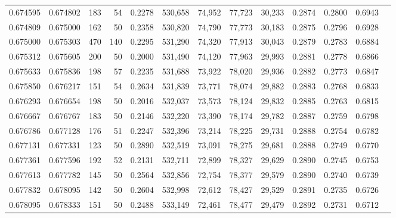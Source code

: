 \begin{tabular}{rrrrrrrrrrrrr}
0.674595 & 0.674802 &    183 &    54 &                                     0.2278 & 530,658 &  74,952 &  77,723 &  30,233 & 0.2874 & 0.2800 & 0.6943 \\
0.674809 & 0.675000 &    162 &    50 &                                     0.2358 & 530,820 &  74,790 &  77,773 &  30,183 & 0.2875 & 0.2796 & 0.6928 \\
0.675000 & 0.675303 &    470 &   140 &                                     0.2295 & 531,290 &  74,320 &  77,913 &  30,043 & 0.2879 & 0.2783 & 0.6884 \\
0.675312 & 0.675605 &    200 &    50 &                                     0.2000 & 531,490 &  74,120 &  77,963 &  29,993 & 0.2881 & 0.2778 & 0.6866 \\
0.675633 & 0.675836 &    198 &    57 &                                     0.2235 & 531,688 &  73,922 &  78,020 &  29,936 & 0.2882 & 0.2773 & 0.6847 \\
0.675850 & 0.676217 &    151 &    54 &                                     0.2634 & 531,839 &  73,771 &  78,074 &  29,882 & 0.2883 & 0.2768 & 0.6833 \\
0.676293 & 0.676654 &    198 &    50 &                                     0.2016 & 532,037 &  73,573 &  78,124 &  29,832 & 0.2885 & 0.2763 & 0.6815 \\
0.676667 & 0.676767 &    183 &    50 &                                     0.2146 & 532,220 &  73,390 &  78,174 &  29,782 & 0.2887 & 0.2759 & 0.6798 \\
0.676786 & 0.677128 &    176 &    51 &                                     0.2247 & 532,396 &  73,214 &  78,225 &  29,731 & 0.2888 & 0.2754 & 0.6782 \\
0.677131 & 0.677331 &    123 &    50 &                                     0.2890 & 532,519 &  73,091 &  78,275 &  29,681 & 0.2888 & 0.2749 & 0.6770 \\
0.677361 & 0.677596 &    192 &    52 &                                     0.2131 & 532,711 &  72,899 &  78,327 &  29,629 & 0.2890 & 0.2745 & 0.6753 \\
0.677613 & 0.677782 &    145 &    50 &                                     0.2564 & 532,856 &  72,754 &  78,377 &  29,579 & 0.2890 & 0.2740 & 0.6739 \\
0.677832 & 0.678095 &    142 &    50 &                                     0.2604 & 532,998 &  72,612 &  78,427 &  29,529 & 0.2891 & 0.2735 & 0.6726 \\
0.678095 & 0.678333 &    151 &    50 &                                     0.2488 & 533,149 &  72,461 &  78,477 &  29,479 & 0.2892 & 0.2731 & 0.6712 \\

\end{tabular}
